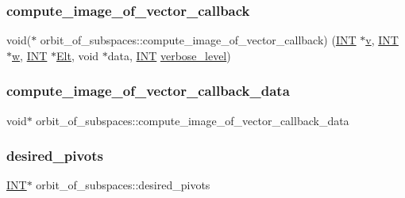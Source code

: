 \subsubsection{\texorpdfstring{compute\+\_\+image\+\_\+of\+\_\+vector\+\_\+callback}{compute\_image\_of\_vector\_callback}}
{\footnotesize\ttfamily void($\ast$ orbit\+\_\+of\+\_\+subspaces\+::compute\+\_\+image\+\_\+of\+\_\+vector\+\_\+callback) (\mbox{\hyperlink{galois_8h_a09fddde158a3a20bd2dcadb609de11dc}{I\+NT}} $\ast$\mbox{\hyperlink{simeon_8_c_aeb3f3030944801b163bc3b829a7f6710}{v}}, \mbox{\hyperlink{galois_8h_a09fddde158a3a20bd2dcadb609de11dc}{I\+NT}} $\ast$\mbox{\hyperlink{alphabet2_8_c_aac374e320caaadeca4874add33b62af2}{w}}, \mbox{\hyperlink{galois_8h_a09fddde158a3a20bd2dcadb609de11dc}{I\+NT}} $\ast$\mbox{\hyperlink{simeon_8_c_aec1406935bdb1fee3561fcb840964100}{Elt}}, void $\ast$data, \mbox{\hyperlink{galois_8h_a09fddde158a3a20bd2dcadb609de11dc}{I\+NT}} \mbox{\hyperlink{simeon_8_c_a818073fbcc2f439e7c56952f67386122}{verbose\+\_\+level}})}

\mbox{\label{classorbit__of__subspaces_a2790229f1d563935b52b255655f2bc90}} 
\subsubsection{\texorpdfstring{compute\+\_\+image\+\_\+of\+\_\+vector\+\_\+callback\+\_\+data}{compute\_image\_of\_vector\_callback\_data}}
{\footnotesize\ttfamily void$\ast$ orbit\+\_\+of\+\_\+subspaces\+::compute\+\_\+image\+\_\+of\+\_\+vector\+\_\+callback\+\_\+data}

\mbox{\label{classorbit__of__subspaces_af4bb41c15c2773bf89e5c95b6526ed8f}} 
\subsubsection{\texorpdfstring{desired\+\_\+pivots}{desired\_pivots}}
{\footnotesize\ttfamily \mbox{\hyperlink{galois_8h_a09fddde158a3a20bd2dcadb609de11dc}{I\+NT}}$\ast$ orbit\+\_\+of\+\_\+subspaces\+::desired\+\_\+pivots}

